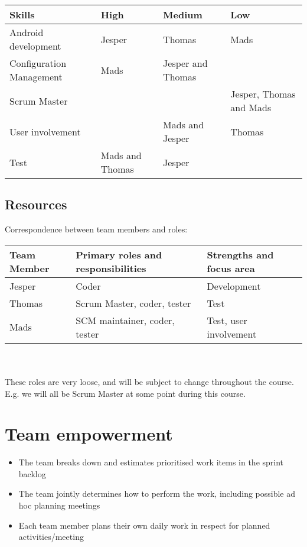 \documentclass[a4paper,11pt]{article}
\begin{document}
\begin{tabular}{|p{4.5cm}|p{3cm}|p{3cm}|p{3cm}|}
\hline
\textbf{Skills}          & \textbf{High}   & \textbf{Medium} & \textbf{Low} 					 \\\hline
Android development      & Jesper & Thomas & Mads 					 \\\hline
Configuration Management & Mads & Jesper and Thomas          &      					 \\\hline
Scrum Master             &        &        & Jesper, Thomas and Mads \\\hline 
User involvement         &        & Mads and Jesper & Thomas \\\hline
Test                     & Mads and Thomas   & Jesper & \\\hline
\end{tabular}

\subsection{Resources} %
\label{subsec:resources}
Correspondence between team members and roles:\\

\begin{tabular}{|p{3cm}|p{5cm}|p{5cm}|}
\hline
\textbf{Team Member} & \textbf{Primary roles and responsibilities}   & \textbf{Strengths and focus area} \\\hline
Jesper               & Coder                   & Development \\\hline
Thomas               & Scrum Master, coder, tester    & Test                 \\\hline
Mads                 & SCM maintainer, coder, tester  & Test, user involvement                         \\\hline 
\end{tabular}
\\
\\
These roles are very loose, and will be subject to change throughout the course. E.g. we will all be Scrum Master at some point during this course.


\section{Team empowerment} %
\label{sec:team_empowerment}
\begin{itemize}
	\item The team breaks down and estimates prioritised work items in the sprint backlog

	\item The team jointly determines how to perform the work, including possible ad hoc planning meetings

	\item Each team member plans their own daily work in respect for planned activities/meeting
\end{itemize}
\end{document}
